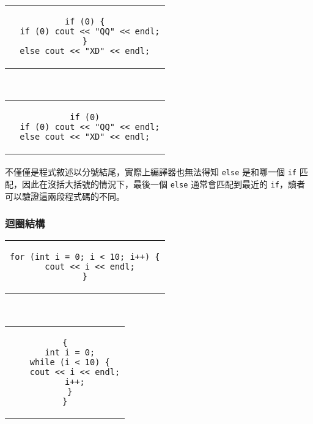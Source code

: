 \documentclass[12pt,a4paper,oneside]{article}
\begin{document}
\begin{CJK}{UTF8}{bkai}
\begin{code}[h!]
\centering
\begin{subcode}{.5\textwidth}
  \centering
  \begin{tabular}{c}
  \begin{lstlisting}
if (0) {
  if (0) cout << "QQ" << endl;
}
else cout << "XD" << endl;
  \end{lstlisting}
  \end{tabular}
  \caption{危險的 \lstinline!else!}
  \label{program:struct:code:dangling:else:1}
\end{subcode}
~
\begin{subcode}{.45\textwidth}
  \centering
  \begin{tabular}{c}
  \begin{lstlisting}
if (0)
  if (0) cout << "QQ" << endl;
else cout << "XD" << endl;
  \end{lstlisting}
  \end{tabular}
  \caption{編譯器會不知道是哪一個 \lstinline!if! 的 \lstinline!else!}
  \label{program:struct:code:dangling:else:2}
\end{subcode}
\caption{懸置的 \lstinline!else!}
\label{program:struct:code:dangling:else}
\end{code}

\paragraph{}不僅僅是程式敘述以分號結尾，實際上編譯器也無法得知 \lstinline!else! 是和哪一個 \lstinline!if! 匹配，因此在沒括大括號的情況下，最後一個 \lstinline!else! 通常會匹配到最近的 \lstinline!if!，讀者可以驗證這兩段程式碼的不同。

\subsubsection{迴圈結構}

\begin{code}[h!]
\centering
\begin{subcode}{.48\textwidth}
\centering
\begin{tabular}{c}
\begin{lstlisting}
for (int i = 0; i < 10; i++) {
  cout << i << endl;
}
\end{lstlisting}
\end{tabular}
\caption{\lstinline!for! 語法}
\end{subcode}
~
\begin{subcode}{.48\textwidth}
\centering
\begin{tabular}{c}
\begin{lstlisting}
{
  int i = 0;
  while (i < 10) {
    cout << i << endl;
    i++;
  }
}
\end{lstlisting}
\end{tabular}
\caption{對應的 \lstinline!while! 語法}
\end{subcode}
\caption{\lstinline!for! 和 \lstinline!while! 的對應關係}
\label{program:struct:code:loop:for:while}
\end{code}


\end{CJK}
\end{document}
